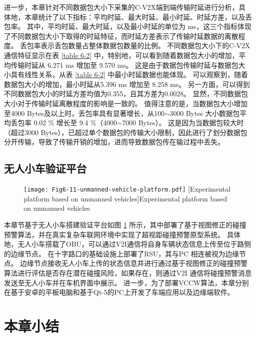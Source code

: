 进一步，本章针对不同数据包大小下采集的C-V2X端到端传输时延进行分析，具体地，本章统计了以下指标：平均时延、最大时延、最小时延、时延方差，以及丢包率。
其中，平均时延、最大时延，以及最小时延的单位为 ms，这三个指标体现了不同数据包大小下取得的时延特征，而时延方差表示了传输时延数据的离散程度。
丢包率表示丢包数量占整体数据包数量的比例。
不同数据包大小下的C-V2X通信特征显示在表 \ref{table 6-2} 中，特别地，可以看到随着数据包大小的增加，平均传输时延从 6.271 ms 增加至 9.570 ms。
这是由于数据包传输时延与数据包大小具有线性关系，从表 \ref{table 6-2} 中最小时延数据也能体现。
可以观察到，随着数据包大小的增加，最小时延从5.396 ms 增加至 8.258 ms。
另一方面，可以得到不同数据包大小的时延方差均值为0.355，且其方差为0.0028。
显然，不同数据包大小对于传输时延离散程度的影响是一致的。
值得注意的是，当数据包大小增加至4000 Bytes及以上时，丢包率具有显著增长，从100$\sim$3000 Bytes 大小数据包平均丢包率 0.02 \% 增长至 9.4 \%（4000$\sim$7000 Bytes）。
这是因为当数据包较大时（超过3000 Bytes），已超过单个数据包的传输大小限制，因此进行了划分数据包分开传输，导致了传输开销的增加，进而导致数据包传在输过程中丢失。

\subsection{无人小车验证平台}

\begin{figure}[h]
\centering
  \texttt{[image: Fig6-11-unmanned-vehicle-platform.pdf]}
  [Experimental platform based on unmanned vehicles]{Experimental platform based on unmanned vehicles}
  \label{fig 6-11}
\end{figure}

本章节基于无人小车搭建验证平台如图 \ref{fig 6-11} 所示，其中部署了基于视图修正的碰撞预警算法，并在真实复杂车联网环境中实现了超视距碰撞预警原型系统。
具体地，无人小车搭载了OBU，可以通过V2I通信将自身车辆状态信息上传至位于路侧的边缘节点。
在十字路口的基础设施上部署了RSU，其与PC 相连被视为边缘节点。
边缘节点接收无人小车上传的状态信息并进行通过基于视图修正的碰撞预警算法进行评估是否存在潜在碰撞风险，如果存在，则通过V2I 通信将碰撞预警消息发送至无人小车并在车机界面中展示。
进一步，为了部署VCCW算法，本章分别在基于安卓的平板电脑和基于Qt-5的PC上开发了车端应用以及边缘端软件。


\section{本章小结}\label{section 6-6}

